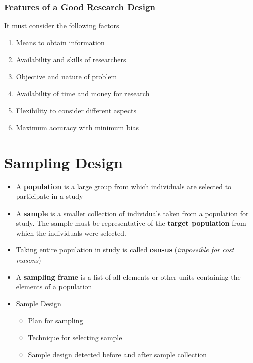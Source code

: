\documentclass{article}
\begin{document}
\subsubsection{Features of a Good Research Design}
It must consider the following factors
\begin{enumerate}
    \item Means to obtain information
    \item Availability and skills of researchers
    \item Objective and nature of problem
    \item Availability of time and money for research
    \item Flexibility to consider different aspects
    \item Maximum accuracy with minimum bias
\end{enumerate}

\section{Sampling Design}

\begin{itemize}
    \item A \textbf{population} is a large group from which individuals are selected to participate in a study
    \item A \textbf{sample} is a smaller collection of individuals taken from a population for study. The sample must be representative of the \textbf{target population} from which the individuals were selected.
    \item Taking entire population in study is called \textbf{census} (\textit{impossible for cost reasons})
    \item A \textbf{sampling frame} is a list of all elements or other units containing the elements of a population
    \item Sample Design
    \begin{itemize}
        \item Plan for sampling
        \item Technique for selecting sample
        \item Sample design detected before and after sample collection
    \end{itemize}
\end{itemize}
\end{document}
